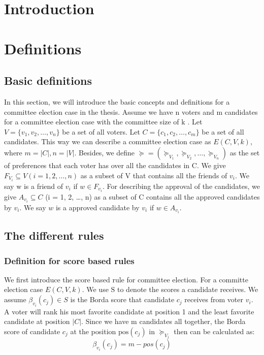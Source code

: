 \documentclass{article}
\begin{document}
\section{Introduction}


\section{Definitions}

\subsection{Basic definitions}
In this section, we will introduce the basic concepts and definitions for a committee election case in the thesis. Assume we have $\mathrm{n}$ voters and $\mathrm{m}$ candidates for a committee election case with the committee size of $\mathrm{k}$ . Let $V = \{ v_1, v_2, \dots , v_n \}$ be a set of all voters. Let $C = \{ c_1, c_2, \dots , c_m \}$ be a set of all candidates. This way we can describe a committee election case as $E(C,V,k)$,  where $m = \vert C \vert, n= \vert V \vert$.  Besides, we define $\succeq = ( \succeq_{V_1}, \succeq_{V_2}, \dots , \succeq_{V_n})$ as the set of preferences that each voter has over all the candidates in $\mathrm{C}$. 
We give $F_{V_i}  \subseteq V (i = 1, 2,  \dots , n)$ as a subset of $\mathrm{V}$ that contains all the friends of $v_i$. We say $\mathrm{w}$ is a friend of $v_i$ if  $w \in F_{v_i}$. For describing the approval of the candidates, we give $A_{v_i}  \subseteq C$ (i = 1, 2,  \dots , n) as a subset of C contains all the approved candidates by $v_i$. We say $w$ is a approved candidate by $v_i$ if $w \in A_{v_i}$.

\subsection{The different rules}

\subsubsection{Definition for score based rules}
We first introduce the score based rule for committee election. For a committe election case $E(C,V,k)$. 
We use  $\mathrm{S}$ to denote the scores a candidate receives. We assume $\beta_{v_i}(c_j) \in S$ is the Borda score that candidate $c_j$ receives from voter $v_i$. A voter will rank his most favorite candidate at position 1 and the least favorite candidate at position  $\vert C \vert$. Since we have $\mathrm{m}$ candidates all together, the Borda score of candidate $c_j$ at the position $\mathrm{pos}{(c_j)}$ in  $\succeq_{V_j}$ then can be calculated as:
\begin{equation}
\beta_{v_i}(c_j) =  m - {pos}{(c_j)} \label{con:bordascore}
\end{equation}
\end{document}
